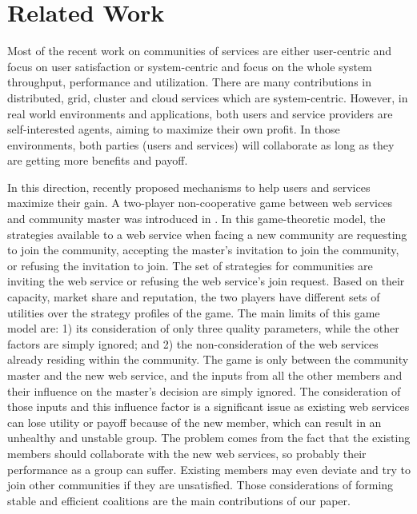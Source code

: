 \documentclass[11pt,onecolumn]{IEEEtran}
\begin{document}
{\section{Related Work}\label{s:related_work}

Most of the recent work on communities of services are either
user-centric and focus on user satisfaction
\cite{Chun02user-centricperformance} or system-centric and focus
on the whole system throughput, performance and utilization. There
are many contributions in distributed, grid, cluster and cloud
services which are system-centric. However, in real world
environments and applications, both users and service providers
are self-interested agents, aiming to maximize their own profit.
In those environments, both parties (users and services) will
collaborate as long as they are getting more benefits and payoff.

In this direction, recently \cite{DBLP:conf/IEEEscc/LimTMB12,
DBLP:conf/IEEEscc/KhosravifarABT11, 10.1109/TSC.2012.12} proposed
mechanisms to help users and services maximize their gain. A
two-player non-cooperative game between web services and community
master was introduced in
\cite{DBLP:conf/IEEEscc/KhosravifarABT11}. In this game-theoretic
model, the strategies available to a web service when facing a new
community are requesting to join the community, accepting the
master's invitation to join the community, or refusing the
invitation to join. The set of strategies for communities are
inviting the web service or refusing the web service's join
request. Based on their capacity, market share and reputation, the
two players have different sets of utilities over the strategy
profiles of the game. The main limits of this game model are: 1)
its consideration of only three quality parameters, while the
other factors are simply ignored; and 2) the non-consideration of
the web services already residing within the community. The game
is only between the community master and the new web service, and
the inputs from all the other members and their influence on the
master's decision are simply ignored. The consideration of those
inputs and this influence factor is a significant issue as
existing web services can lose utility or payoff because of the
new member, which can result in an unhealthy and unstable group.
The problem comes from the fact that the existing members should
collaborate with the new web services, so probably their
performance as a group can suffer. Existing members may even
deviate and try to join other communities if they are unsatisfied.
Those considerations of forming stable and efficient coalitions
are the main contributions of our paper.

}
\end{document}
